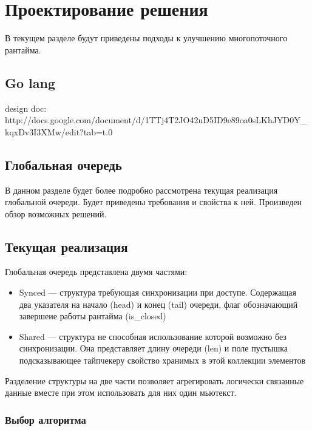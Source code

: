 
\section{Проектирование решения}

В текущем разделе будут приведены подходы к улучшению многопоточного рантайма.

\subsection{Go lang}

design doc: http://docs.google.com/document/d/1TTj4T2JO42uD5ID9e89oa0sLKhJYD0Y_kqxDv3I3XMw/edit?tab=t.0

\subsection{Глобальная очередь}

В данном разделе будет более подробно рассмотрена текущая реализация глобальной очереди. Будет приведены требования и свойства к ней. Произведен обзор возможных решений.

\subsection{Текущая реализация}

Глобальная очередь представлена двумя частями:

\begin{itemize}
    \item Synced --- структура требующая синхронизации при доступе. Содержащая два указателя на начало (head) и конец (tail) очереди, флаг обозначающий завершеие работы рантайма (is_closed)
    \item Shared --- структура не способная использование которой возможно без синхронизации. Она представляет длину очереди (len) и поле пустышка подсказывающее тайпчекеру свойство хранимых в этой коллекции элементов
\end{itemize}

Разделение структуры на две части позволяет агрегировать логически связанные данные вместе при этом использовать для них один мьютекст.

\subsubsection{Выбор алгоритма}

